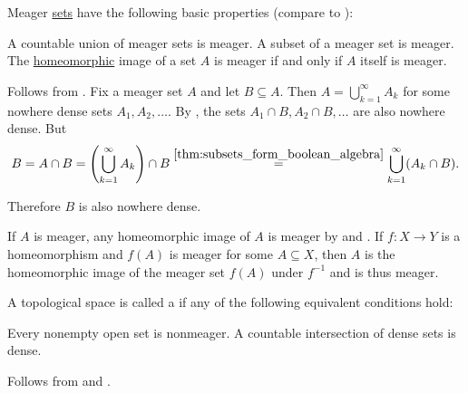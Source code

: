 \begin{Proposition}\label{thm:meager_set_properties}\cite[43]{Rudin1991}
  Meager \hyperref[def:meager_set]{sets} have the following basic properties (compare to ):
  \begin{PropEnum}
     A countable union of meager sets is meager.
     A subset of a meager set is meager.
     The \hyperref[def:homeomorphism]{homeomorphic} image of a set \( A \) is meager if and only if \( A \) itself is meager.
  \end{PropEnum}
\end{Proposition}
\begin{RefListProof}
     Follows from .
     Fix a meager set \( A \) and let \( B \subseteq A \). Then \( A = \bigcup_{k=1}^\infty A_k \) for some nowhere dense sets \( A_1, A_2, \ldots \). By , the sets \( A_1 \cap B, A_2 \cap B, \ldots \) are also nowhere dense. But
    \begin{equation*}
      B
      =
      A \cap B
      =
      \left(\bigcup_{k=1}^\infty A_k \right) \cap B
      \overset {\ref{thm:subsets_form_boolean_algebra}} =
      \bigcup_{k=1}^\infty (A_k \cap B).
    \end{equation*}

    Therefore \( B \) is also nowhere dense.

    \mbox{}
    \begin{RefList}
      \INecessity If \( A \) is meager, any homeomorphic image of \( A \) is meager by  and .
      \ISufficiency If \( f: X \to Y \) is a homeomorphism and \( f(A) \) is meager for some \( A \subseteq X \), then \( A \) is the homeomorphic image of the meager set \( f(A) \) under \( f^{-1} \) and is thus meager.
    \end{RefList}
\end{RefListProof}

\begin{Definition}\label{def:baire_space}
  A topological space is called a  if any of the following equivalent conditions hold:
  \begin{DefEnum}
     Every nonempty open set is nonmeager.
     A countable intersection of dense sets is dense.
  \end{DefEnum}
\end{Definition}
\begin{RefListProof}
     Follows from  and .
\end{RefListProof}


